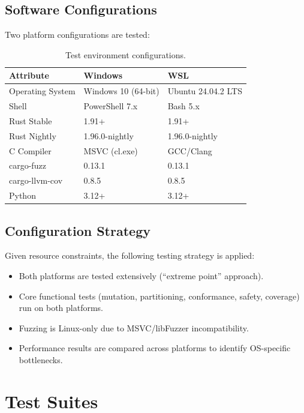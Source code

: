 \documentclass[11pt,a4paper]{article}
\begin{document}
\subsection{Software Configurations}

Two platform configurations are tested:

\begin{table}[H]
\centering
\caption{Test environment configurations.}
\begin{tabular}{lll}
\toprule
\textbf{Attribute} & \textbf{Windows} & \textbf{WSL} \\
\midrule
Operating System   & Windows 10 (64-bit) & Ubuntu 24.04.2 LTS \\
Shell              & PowerShell 7.x      & Bash 5.x \\
Rust Stable        & 1.91+               & 1.91+ \\
Rust Nightly       & 1.96.0-nightly      & 1.96.0-nightly \\
C Compiler         & MSVC (cl.exe)       & GCC/Clang \\
cargo-fuzz         & 0.13.1              & 0.13.1 \\
cargo-llvm-cov     & 0.8.5               & 0.8.5 \\
Python             & 3.12+               & 3.12+ \\
\bottomrule
\end{tabular}
\end{table}

\subsection{Configuration Strategy}

Given resource constraints, the following testing strategy is applied:
\begin{itemize}[noitemsep]
\item Both platforms are tested extensively (``extreme point'' approach).
\item Core functional tests (mutation, partitioning, conformance, safety, coverage) run on both platforms.
\item Fuzzing is Linux-only due to MSVC/libFuzzer incompatibility.
\item Performance results are compared across platforms to identify OS-specific bottlenecks.
\end{itemize}

\section{Test Suites}
\end{document}
